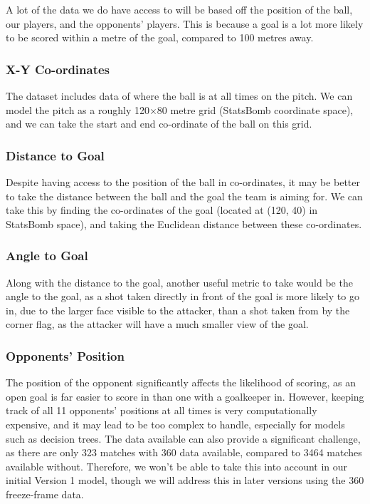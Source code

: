 \documentclass{article}
\begin{document}
A lot of the data we do have access to will be based off the position of the ball, our players, and the opponents' players. This is because a goal is a lot more likely to be scored within a metre of the goal, compared to 100 metres away.

\subsubsection{X-Y Co-ordinates}

The dataset includes data of where the ball is at all times on the pitch. We can model the pitch as a roughly 120$\times$80 metre grid (StatsBomb coordinate space), and we can take the start and end co-ordinate of the ball on this grid.

\subsubsection{Distance to Goal}

Despite having access to the position of the ball in co-ordinates, it may be better to take the distance between the ball and the goal the team is aiming for. We can take this by finding the co-ordinates of the goal (located at (120, 40) in StatsBomb space), and taking the Euclidean distance between these co-ordinates.

\subsubsection{Angle to Goal}

Along with the distance to the goal, another useful metric to take would be the angle to the goal, as a shot taken directly in front of the goal is more likely to go in, due to the larger face visible to the attacker, than a shot taken from by the corner flag, as the attacker will have a much smaller view of the goal.

\subsubsection{Opponents' Position}

The position of the opponent significantly affects the likelihood of scoring, as an open goal is far easier to score in than one with a goalkeeper in. However, keeping track of all 11 opponents' positions at all times is very computationally expensive, and it may lead to be too complex to handle, especially for models such as decision trees. The data available can also provide a significant challenge, as there are only 323 matches with 360 data available, compared to 3464 matches available without. Therefore, we won't be able to take this into account in our initial Version 1 model, though we will address this in later versions using the 360 freeze-frame data.
\end{document}
